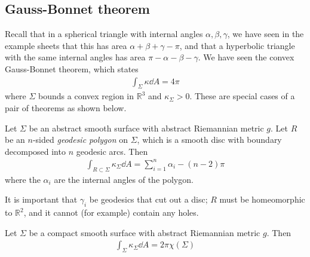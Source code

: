 \subsection{Gauss-Bonnet theorem}
Recall that in a spherical triangle with internal angles $\alpha, \beta, \gamma$, we have seen in the example sheets that this has area $\alpha + \beta + \gamma - \pi$, and that a hyperbolic triangle with the same internal angles has area $\pi - \alpha - \beta - \gamma$.
We have seen the convex Gauss-Bonnet theorem, which states
\begin{align*}
	\int_\Sigma \kappa \dd{A} = 4\pi
\end{align*}
where $\Sigma$ bounds a convex region in $\mathbb R^3$ and $\kappa_\Sigma > 0$.
These are special cases of a pair of theorems as shown below.
\begin{theorem}
	Let $\Sigma$ be an abstract smooth surface with abstract Riemannian metric $g$.
	Let $R$ be an $n$-sided \textit{geodesic polygon} on $\Sigma$, which is a smooth disc with boundary decomposed into $n$ geodesic arcs.
	Then
	\begin{align*}
		\int_{R \subset \Sigma} \kappa_\Sigma \dd{A} = \sum_{i=1}^n \alpha_i - (n-2)\pi
	\end{align*}
	where the $\alpha_i$ are the internal angles of the polygon.
\end{theorem}
It is important that $\gamma_i$ be geodesics that cut out a disc; $R$ must be homeomorphic to $\mathbb R^2$, and it cannot (for example) contain any holes.
\begin{theorem}
	Let $\Sigma$ be a compact smooth surface with abstract Riemannian metric $g$.
	Then
	\begin{align*}
		\int_\Sigma \kappa_\Sigma \dd{A} = 2\pi \chi(\Sigma)
	\end{align*}
\end{theorem}
